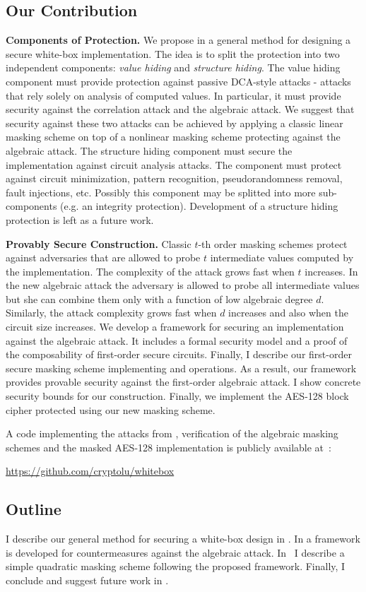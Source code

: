 
\subsection{Our Contribution}

{\bf Components of Protection.} We propose in  a general method for designing a secure white-box implementation. The idea is to split the protection into two independent components: \emph{value hiding} and \emph{structure hiding}. The value hiding component must provide protection against passive DCA-style attacks - attacks that rely solely on analysis of computed values. In particular, it must provide security against the correlation attack and the algebraic attack. We suggest that security against these two attacks can be achieved by applying a classic linear masking scheme on top of a nonlinear masking scheme protecting against the algebraic attack. The structure hiding component must secure the implementation against circuit analysis attacks. The component must protect against circuit minimization, pattern recognition, pseudorandomness removal, fault injections, etc. Possibly this component may be splitted into more sub-components (e.g. an integrity protection). Development of a structure hiding protection is left as a future work.

{\bf Provably Secure Construction.} Classic $t$-th order masking schemes protect against adversaries that are allowed to probe $t$ intermediate values computed by the implementation. The complexity of the attack grows fast when $t$ increases. In the new algebraic attack the adversary is allowed to probe all intermediate values but she can combine them only with a function of low algebraic degree $d$. Similarly, the attack complexity grows fast when $d$ increases and also when the circuit size increases. We develop a framework for securing an implementation against the algebraic attack. It includes a formal security model and a proof of the composability of first-order secure circuits. Finally, I describe our first-order secure masking scheme implementing \txor{} and \tand{} operations. As a result, our framework provides provable security against the first-order algebraic attack. I show concrete security bounds for our construction. Finally, we implement the AES-128 block cipher protected using our new masking scheme.

A code implementing the attacks from , verification of the algebraic masking schemes and the masked AES-128 implementation is publicly available at~\cite{OurWhiteboxCode}:
\begin{center}
    \url{https://github.com/cryptolu/whitebox}
\end{center}

\subsection{Outline}
I describe our general method for securing a white-box design in . In  a framework is developed for countermeasures against the algebraic attack. In~ I describe a simple quadratic masking scheme following the proposed framework. Finally, I conclude and suggest future work in .